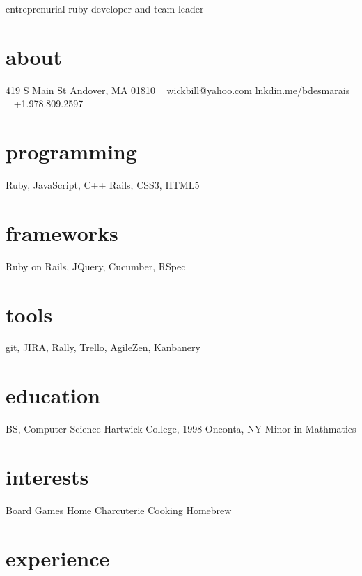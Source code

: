 \documentclass[]{friggeri-cv}
\begin{document}
       {entreprenurial ruby developer and team leader}
       
\begin{aside}
  \section{about}
    419 S Main St
    Andover, MA 01810
    ~
    \href{mailto:wickbill@yahoo.com}{wickbill@yahoo.com}
    \href{http:/lnkdin.me/bdesmarais}{lnkdin.me/bdesmarais}
    ~
    +1.978.809.2597
  \section{programming}
    Ruby, JavaScript, C++
    Rails, CSS3, HTML5
  \section{frameworks}
  Ruby on Rails, JQuery, Cucumber, RSpec
  \section{tools}
  git, JIRA, Rally, Trello, AgileZen, Kanbanery
  \section{education}
    BS, Computer Science
    Hartwick College, 1998
    Oneonta, NY
    Minor in Mathmatics
  \section{interests}
  Board Games
  Home Charcuterie
  Cooking
  Homebrew
\end{aside}

\section{experience}
\end{document}
